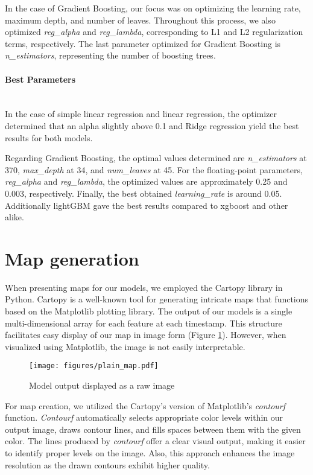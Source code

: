 In the case of Gradient Boosting, our focus was on optimizing the learning rate, maximum depth, and number of leaves. Throughout this process, we also optimized \emph{reg\_alpha} and \emph{reg\_lambda}, corresponding to L1 and L2 regularization terms, respectively. The last parameter optimized for Gradient Boosting is \emph{n\_estimators}, representing the number of boosting trees.

\paragraph{Best Parameters} \label{chap:best_params}\mbox{} \\
\noindent In the case of simple linear regression and linear regression, the optimizer determined that an alpha slightly above 0.1 and Ridge regression yield the best results for both models. 

Regarding Gradient Boosting, the optimal values determined are \emph{n\_estimators} at 370, \emph{max\_depth} at 34, and \emph{num\_leaves} at 45. For the floating-point parameters, \emph{reg\_alpha} and \emph{reg\_lambda}, the optimized values are approximately 0.25 and 0.003, respectively. Finally, the best obtained \emph{learning\_rate} is around 0.05. Additionally lightGBM gave the best results compared to xgboost and other alike.


\section{Map generation}
When presenting maps for our models, we employed the Cartopy \cite{Cartopy} library in Python. Cartopy is a well-known tool for generating intricate maps that functions based on the Matplotlib \cite{Hunter:2007} plotting library.
The output of our models is a single multi-dimensional array for each feature at each timestamp. This structure facilitates easy display of our map in image form (Figure \ref{fig:raw_image}). However, when visualized using Matplotlib, the image is not easily interpretable.

\begin{figure}[!ht]
    \centering
    \texttt{[image: figures/plain\_map.pdf]}
    \caption{Model output displayed as a raw image}
    \label{fig:raw_image}
\end{figure}

For map creation, we utilized the Cartopy’s version of Matplotlib’s \textit{contourf} function. \textit{Contourf} automatically selects appropriate color levels within our output image, draws contour lines, and fills spaces between them with the given color. The lines produced by \textit{contourf} offer a clear visual output, making it easier to identify proper levels on the image. Also, this approach enhances the image resolution as the drawn contours exhibit higher quality.

